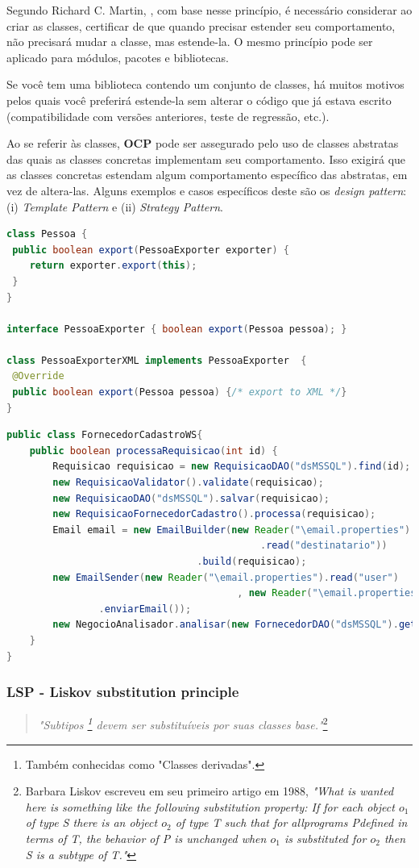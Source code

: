 \documentclass[12pt]{article}
\begin{document}
Segundo Richard C. Martin, \cite{ROBERT_MARTIN_THE_CLEAN_ARCHITECTURE}, com base nesse princípio, é necessário considerar ao criar as classes, certificar de que quando precisar estender seu comportamento, não precisará mudar a classe, mas estende-la. O mesmo princípio pode ser aplicado para módulos, pacotes e bibliotecas.

Se você tem uma biblioteca contendo um conjunto de classes, há muitos motivos pelos quais você preferirá estende-la sem alterar o código que já estava escrito (compatibilidade com versões anteriores, teste de regressão, etc.).

Ao se referir às classes, \textbf{OCP} pode ser assegurado pelo uso de classes abstratas das quais as classes concretas implementam seu comportamento. Isso exigirá que as classes concretas estendam algum comportamento específico das abstratas, em vez de altera-las. Alguns exemplos e casos específicos deste são os \textit{design pattern}: (i) \textit{Template Pattern} e (ii) \textit{Strategy Pattern}.

\begin{lstlisting}[caption=Exemplo em conformidade ao OCP,language=java]
class Pessoa {
 public boolean export(PessoaExporter exporter) {
	return exporter.export(this);
 }
}

interface PessoaExporter { boolean export(Pessoa pessoa); }

class PessoaExporterXML implements PessoaExporter  {
 @Override
 public boolean export(Pessoa pessoa) {/* export to XML */}
}
\end{lstlisting}

\begin{lstlisting}[caption=Exemplo de violação ao OCP,language=java]
public class FornecedorCadastroWS{
	public boolean processaRequisicao(int id) {
		Requisicao requisicao = new RequisicaoDAO("dsMSSQL").find(id);
		new RequisicaoValidator().validate(requisicao);
		new RequisicaoDAO("dsMSSQL").salvar(requisicao);
		new RequisicaoFornecedorCadastro().processa(requisicao);
		Email email = new EmailBuilder(new Reader("\email.properties")
											.read("destinatario"))
								 .build(requisicao);
		new EmailSender(new Reader("\email.properties").read("user")
										, new Reader("\email.properties").read("pwd")
				.enviarEmail());
		new NegocioAnalisador.analisar(new FornecedorDAO("dsMSSQL").get(requisicao));
	}
}
\end{lstlisting}

\subsubsection{LSP - Liskov substitution principle}
\begin{quote}
	\textit{"Subtipos \footnote{Também conhecidas como "Classes derivadas".} devem ser substituíveis por suas classes base."}\footnote{Barbara Liskov escreveu em seu primeiro artigo em 1988, \textit{"What is wanted here is something like the following substitution property: If for each object $ o_1 $ of type S there is an object $ o_2 $ of type T such that for allprograms Pdefined in terms of T, the behavior of P is unchanged when $ o_1 $ is substituted for $ o_2 $ then S is a subtype of T."} }
\end{quote}
\end{document}
